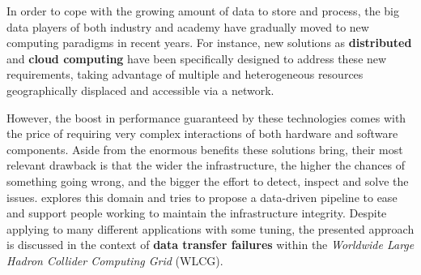In order to cope with the growing amount of data to store and process, the big data players of both industry and academy have gradually moved to new computing paradigms in recent years. 
For instance, new solutions as \textbf{distributed} and \textbf{cloud computing} \cite{kshemkalyani2011distributed, wang2010cloud} have been specifically designed to address these new requirements, taking advantage of multiple and heterogeneous resources geographically displaced and accessible via a network.

However, the boost in performance guaranteed by these technologies comes with the price of requiring very complex interactions of both hardware and software components. 
Aside from the enormous benefits these solutions bring, their most relevant drawback is that the wider the infrastructure, the higher the chances of something going wrong, and the bigger the effort to detect, inspect and solve the issues.
 explores this domain and tries to propose a data-driven pipeline to ease and support people working to maintain the infrastructure integrity.
Despite applying to many different applications with some tuning, the presented approach is discussed in the context of \textbf{data transfer failures} within the \emph{Worldwide Large Hadron Collider Computing Grid} (WLCG).